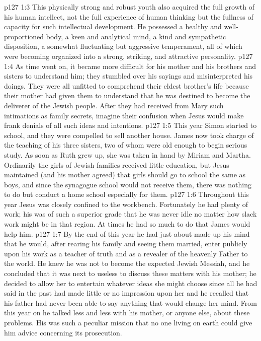 \vs p127 1:3 This physically strong and robust youth also acquired the full growth of his human intellect, not the full experience of human thinking but the fullness of capacity for such intellectual development. He possessed a healthy and well\hyp{}proportioned body, a keen and analytical mind, a kind and sympathetic disposition, a somewhat fluctuating but aggressive temperament, all of which were becoming organized into a strong, striking, and attractive personality.
\vs p127 1:4 \pc As time went on, it became more difficult for his mother and his brothers and sisters to understand him; they stumbled over his sayings and misinterpreted his doings. They were all unfitted to comprehend their eldest brother’s life because their mother had given them to understand that he was destined to become the deliverer of the Jewish people. After they had received from Mary such intimations as family secrets, imagine their confusion when Jesus would make frank denials of all such ideas and intentions.
\vs p127 1:5 \pc This year Simon started to school, and they were compelled to sell another house. James now took charge of the teaching of his three sisters, two of whom were old enough to begin serious study. As soon as Ruth grew up, she was taken in hand by Miriam and Martha. Ordinarily the girls of Jewish families received little education, but Jesus maintained (and his mother agreed) that girls should go to school the same as boys, and since the synagogue school would not receive them, there was nothing to do but conduct a home school especially for them.
\vs p127 1:6 Throughout this year Jesus was closely confined to the workbench. Fortunately he had plenty of work; his was of such a superior grade that he was never idle no matter how slack work might be in that region. At times he had so much to do that James would help him.
\vs p127 1:7 By the end of this year he had just about made up his mind that he would, after rearing his family and seeing them married, enter publicly upon his work as a teacher of truth and as a revealer of the heavenly Father to the world. He knew he was not to become the expected Jewish Messiah, and he concluded that it was next to useless to discuss these matters with his mother; he decided to allow her to entertain whatever ideas she might choose since all he had said in the past had made little or no impression upon her and he recalled that his father had never been able to say anything that would change her mind. From this year on he talked less and less with his mother, or anyone else, about these problems. His was such a peculiar mission that no one living on earth could give him advice concerning its prosecution.
